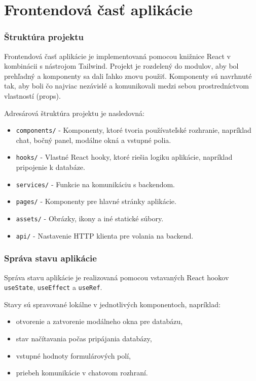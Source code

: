 \documentclass[a4paper, 12pt]{article}
\begin{document}
\clearpage
\section{Frontendová časť aplikácie}

\subsubsection{Štruktúra projektu}

Frontendová časť aplikácie je implementovaná pomocou knižnice React v kombinácii s nástrojom Tailwind. Projekt je rozdelený do modulov, aby bol prehľadný a komponenty sa dali ľahko znovu použiť. Komponenty sú navrhnuté tak, aby boli čo najviac nezávislé a komunikovali medzi sebou prostredníctvom vlastností (props).

Adresárová štruktúra projektu je nasledovná:

\begin{itemize}
    \item \texttt{components/} - Komponenty, ktoré tvoria používateľské rozhranie, napríklad chat, bočný panel, modálne okná a vstupné polia.
    \item \texttt{hooks/} - Vlastné React hooky, ktoré riešia logiku aplikácie, napríklad pripojenie k databáze.
    \item \texttt{services/} - Funkcie na komunikáciu s backendom.
    \item \texttt{pages/} - Komponenty pre hlavné stránky aplikácie.
    \item \texttt{assets/} - Obrázky, ikony a iné statické súbory.
    \item \texttt{api/} - Nastavenie HTTP klienta pre volania na backend.
\end{itemize}

\subsubsection{Správa stavu aplikácie}

Správa stavu aplikácie je realizovaná pomocou vstavaných React hookov \texttt{useState}, \texttt{useEffect} a \texttt{useRef}.

Stavy sú spravované lokálne v jednotlivých komponentoch, napríklad:
\begin{itemize}
    \item otvorenie a zatvorenie modálneho okna pre databázu,
    \item stav načítavania počas pripájania databázy,
    \item vstupné hodnoty formulárových polí,
    \item priebeh komunikácie v chatovom rozhraní.
\end{itemize}
\end{document}
